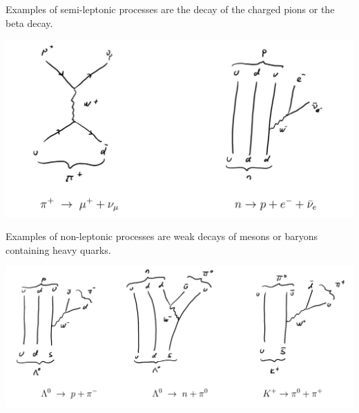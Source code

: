 \documentclass[12pt]{article}
\begin{document}
\clearpage
Examples of semi-leptonic processes are the decay of the charged pions or the beta decay. 
\begin{center}
\includegraphics[scale=0.2]{images/WeakSemileptonic.png}
\end{center}
Examples of non-leptonic processes are weak decays of mesons or baryons containing heavy quarks. 
\begin{center}
\includegraphics[scale=0.2]{images/WeakHadronic.png}
\end{center}
\end{document}
